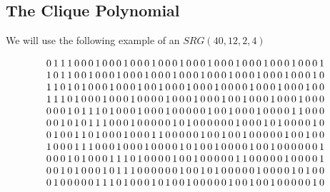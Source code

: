 \documentclass[a4paper,10pt]{article}
\begin{document}
\subsection{\sc The Clique Polynomial}
We will use the following example of an $SRG(40,12,2,4)$
\begin{scriptsize}
\[
\arraycolsep=1.0pt\def\arraystretch{1.0}
 \begin{array}{rrrrrrrrrrrrrrrrrrrrrrrrrrrrrrrrrrrrrrrr}
0 & 1 & 1 & 1 & 0 & 0 & 0 & 1 & 0 & 0 & 0 & 1 & 0 & 0 & 0 & 1 & 0 & 0 & 0 & 1 & 0 & 0 & 0 & 1 & 0 & 0 & 0 & 1 & 0 & 0 & 0 & 1 & 0 & 0 & 0 & 1 & 0 & 0 & 0 & 1 \\
1 & 0 & 1 & 1 & 0 & 0 & 1 & 0 & 0 & 0 & 1 & 0 & 0 & 0 & 1 & 0 & 0 & 0 & 1 & 0 & 0 & 0 & 1 & 0 & 0 & 0 & 1 & 0 & 0 & 0 & 1 & 0 & 0 & 0 & 1 & 0 & 0 & 0 & 1 & 0 \\
1 & 1 & 0 & 1 & 0 & 1 & 0 & 0 & 0 & 1 & 0 & 0 & 0 & 1 & 0 & 0 & 1 & 0 & 0 & 0 & 1 & 0 & 0 & 0 & 1 & 0 & 0 & 0 & 0 & 1 & 0 & 0 & 0 & 1 & 0 & 0 & 0 & 1 & 0 & 0 \\
1 & 1 & 1 & 0 & 1 & 0 & 0 & 0 & 1 & 0 & 0 & 0 & 1 & 0 & 0 & 0 & 0 & 1 & 0 & 0 & 0 & 1 & 0 & 0 & 0 & 1 & 0 & 0 & 1 & 0 & 0 & 0 & 1 & 0 & 0 & 0 & 1 & 0 & 0 & 0 \\
0 & 0 & 0 & 1 & 0 & 1 & 1 & 1 & 0 & 1 & 0 & 0 & 0 & 1 & 0 & 0 & 0 & 1 & 0 & 0 & 0 & 0 & 0 & 1 & 0 & 0 & 1 & 0 & 0 & 0 & 1 & 0 & 0 & 0 & 0 & 1 & 1 & 0 & 0 & 0 \\
0 & 0 & 1 & 0 & 1 & 0 & 1 & 1 & 1 & 0 & 0 & 0 & 1 & 0 & 0 & 0 & 0 & 0 & 1 & 0 & 1 & 0 & 0 & 0 & 0 & 0 & 0 & 1 & 0 & 0 & 0 & 1 & 0 & 1 & 0 & 0 & 0 & 0 & 1 & 0 \\
0 & 1 & 0 & 0 & 1 & 1 & 0 & 1 & 0 & 0 & 0 & 1 & 0 & 0 & 0 & 1 & 1 & 0 & 0 & 0 & 0 & 0 & 1 & 0 & 0 & 1 & 0 & 0 & 1 & 0 & 0 & 0 & 0 & 0 & 1 & 0 & 0 & 1 & 0 & 0 \\
1 & 0 & 0 & 0 & 1 & 1 & 1 & 0 & 0 & 0 & 1 & 0 & 0 & 0 & 1 & 0 & 0 & 0 & 0 & 1 & 0 & 1 & 0 & 0 & 1 & 0 & 0 & 0 & 0 & 1 & 0 & 0 & 1 & 0 & 0 & 0 & 0 & 0 & 0 & 1 \\
0 & 0 & 0 & 1 & 0 & 1 & 0 & 0 & 0 & 1 & 1 & 1 & 0 & 1 & 0 & 0 & 0 & 0 & 1 & 0 & 0 & 1 & 0 & 0 & 0 & 0 & 0 & 1 & 1 & 0 & 0 & 0 & 0 & 0 & 1 & 0 & 0 & 0 & 0 & 1 \\
0 & 0 & 1 & 0 & 1 & 0 & 0 & 0 & 1 & 0 & 1 & 1 & 1 & 0 & 0 & 0 & 0 & 0 & 0 & 1 & 0 & 0 & 1 & 0 & 1 & 0 & 0 & 0 & 0 & 0 & 1 & 0 & 0 & 0 & 0 & 1 & 0 & 1 & 0 & 0 \\
0 & 1 & 0 & 0 & 0 & 0 & 0 & 1 & 1 & 1 & 0 & 1 & 0 & 0 & 0 & 1 & 0 & 1 & 0 & 0 & 1 & 0 & 0 & 0 & 0 & 0 & 1 & 0 & 0 & 1 & 0 & 0 & 1 & 0 & 0 & 0 & 0 & 0 & 1 & 0 \\

\end{array}\]
\end{scriptsize}
\end{document}
